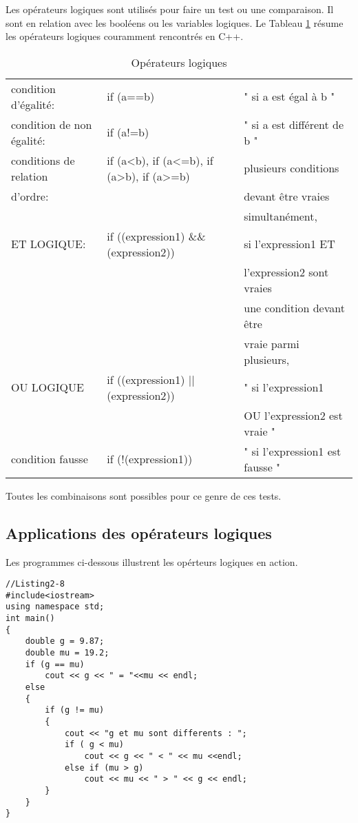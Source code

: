 \documentclass[a4paper, oneside,11pt]{book}
\begin{document}
Les op\'erateurs logiques sont utilis\'es pour faire un test ou une comparaison. Il sont en relation avec les bool\'eens ou les variables logiques. Le Tableau \ref{op_log} r\'esume les op\'erateurs logiques
couramment rencontr\'es en C++.
\newpage
\begin{table}[hhhh]
\begin{center}
\begin{tabular}{|lll|}
\hline
condition d'\'egalit\'e: &if (a==b)&" si a est \'egal \`a b "\\
condition de non \'egalit\'e: & if (a!=b) &" si a est diff\'erent de b "\\
conditions de relation  &if (a<b), if (a<=b), if (a>b), if (a>=b)&plusieurs conditions \\
d'ordre:&&devant \^etre vraies\\
& &  simultan\'ement, \\

ET LOGIQUE: & if ((expression1) \&\& (expression2)) &  si l'expression1 ET \\
&&l'expression2 sont vraies \\
&&une condition devant \^etre \\
&&vraie parmi plusieurs,\\
OU LOGIQUE & if ((expression1) || (expression2)) &" si l'expression1 \\
&&OU l'expression2 est vraie "\\
condition fausse & if (!(expression1)) & " si l'expression1 est fausse "\\
\hline
\end{tabular}
\vspace{-0.25cm}\caption{Op\'erateurs logiques}\label{op_log}
\end{center}
\end{table}


Toutes les combinaisons sont possibles pour ce genre de ces tests.

\subsection{Applications des op\'erateurs logiques}
Les programmes ci-dessous illustrent les op\'erteurs logiques en action.

\begin{lstlisting}
//Listing2-8
#include<iostream>
using namespace std;
int main()
{
    double g = 9.87;
    double mu = 19.2;
    if (g == mu)
        cout << g << " = "<<mu << endl;
    else
    {
        if (g != mu)
        {
            cout << "g et mu sont differents : ";
            if ( g < mu)
                cout << g << " < " << mu <<endl;
            else if (mu > g)
                cout << mu << " > " << g << endl;
        }
    }
}

\end{lstlisting}
\end{document}
